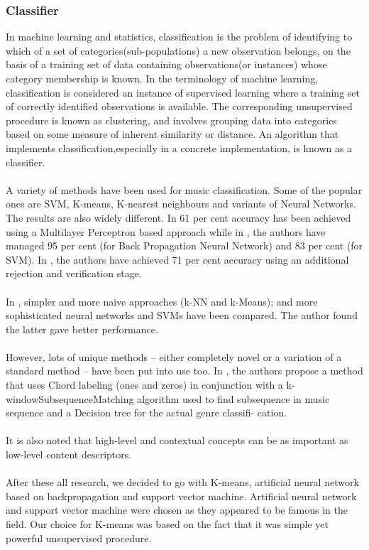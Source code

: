 \subsubsection{Classifier}
In machine learning and statistics, classification is the problem of identifying to which of a set of categories(sub-populations) a 
new observation belongs, on the basis of a training set of data containing observations(or instances) whose category membership is known.
In the terminology of machine learning, classification is considered an instance of supervised learning where a training set of correctly identified observations is available.
The corresponding unsupervised procedure is known as clustering, and involves grouping data into categories based on some measure of inherent similarity or distance.
An algorithm that implements classification,especially in a concrete implementation, is known as a classifier.\\
\\
A variety of methods have been used for music classification. Some of the popular ones are
SVM, K-means, K-nearest neighbours and variants of Neural Networks.
The results are also widely different. In \cite{Neumayer2004} 61 per cent accuracy has been achieved using
a Multilayer Perceptron based approach while in \cite{Kour2015}, the authors have managed 95 per cent
(for Back Propagation Neural Network) and 83 per cent (for SVM).
In \cite{Koerich2013}, the authors have achieved 71 per cent accuracy using an additional rejection and
verification stage.\\
\\
In \cite{Haggblade2011}, simpler and more naive approaches (k-NN and k-Means); and more sophisticated
neural networks and SVMs have been compared. The author found the latter gave better
performance.\\
\\
However, lots of unique methods – either completely novel or a variation of a standard
method – have been put into use too. In \cite{Nasridinov2014}, the authors propose a method that uses Chord
labeling (ones and zeros) in conjunction with a k-windowSubsequenceMatching algorithm
used to find subsequence in music sequence and a Decision tree for the actual genre classifi-
cation.\\
\\
It is also noted that high-level and contextual concepts can be as important as low-level
content descriptors\cite{Anglade2010}.\\
\\
After these all research, we decided to go with K-means, artificial neural network based on backpropagation
and support vector machine. Artificial neural network and support vector machine were chosen as they appeared to be famous in the field. Our choice for K-means 
was based on the fact that it was simple yet powerful unsupervised procedure.

